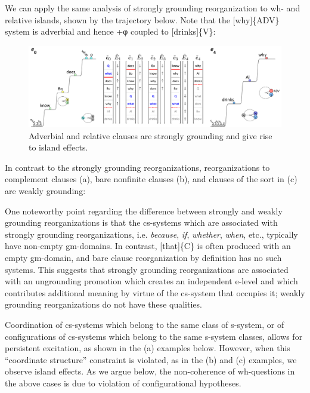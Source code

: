   We can apply the same analysis of strongly grounding reorganization to wh- and relative islands, shown by the trajectory below. Note that the [why]\{ADV\} system is adverbial and hence +φ coupled to [drinks]\{V\}:

  
\begin{figure}
\includegraphics[width=\textwidth]{figures/Tilsen-img164.png}
\caption{Adverbial and relative clauses are strongly grounding and give rise to island effects.}
\label{fig:7:20}
\end{figure}
 

  In contrast to the strongly grounding reorganizations, reorganizations to complement clauses (a), bare nonfinite clauses (b), and clauses of the sort in (c) are weakly grounding:

\ea
{}
\z
\z

  One noteworthy point regarding the difference between strongly and weakly grounding reorganizations is that the cs-systems which are associated with strongly grounding reorganizations, i.e. \textit{because}, \textit{if}, \textit{whether}, \textit{when}, etc., typically have non-empty gm-domains. In contrast, [that]\{C\} is often produced with an empty gm-domain, and bare clause reorganization by definition has no such systems. This suggests that strongly grounding reorganizations are associated with an ungrounding promotion which creates an independent e-level and which contributes additional meaning by virtue of the cs-system that occupies it; weakly grounding reorganizations do not have these qualities.

  Coordination of cs-systems which belong to the same class of s-system, or of configurations of cs-systems which belong to the same s-system classes, allows for persistent excitation, as shown in the (a) examples below. However, when this “coordinate structure” constraint is violated, as in the (b) and (c) examples, we observe island effects. As we argue below, the non-coherence of wh-questions in the above cases is due to violation of configurational hypotheses.

